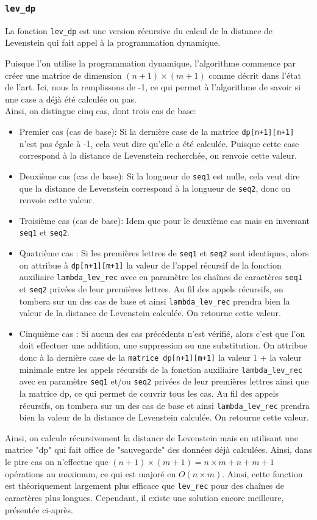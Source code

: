 \documentclass[12pt]{article}
\begin{document}
\subsubsection{\texttt{lev\_dp}}
La fonction \texttt{lev\_dp} est une version récursive du calcul de la distance de Levenstein qui fait appel à la programmation dynamique.

Puisque l'on utilise la programmation dynamique, l'algorithme commence par créer une matrice de dimension $(n+1)\times (m+1)$ comme décrit dans l'état de l'art. Ici, nous la remplissons de -1, ce qui permet à l'algorithme de savoir si une case a déjà  été calculée ou pas.\\
Ainsi, on distingue cinq cas, dont trois cas de base:
\begin{itemize}
    \item Premier cas (cas de base): Si la dernière case de la matrice \texttt{dp[n+1][m+1]} n'est pas égale à -1, cela veut dire qu'elle a été calculée. Puisque cette case correspond à la distance de Levenstein recherchée, on renvoie cette valeur.
    \item Deuxième cas (cas de base): Si la longueur de \texttt{seq1} est nulle, cela veut dire que la distance de Levenstein correspond à la longueur de \texttt{seq2}, donc on renvoie cette valeur.
    \item Troisième cas (cas de base): Idem que pour le deuxième cas mais en inversant \texttt{seq1} et \texttt{seq2}.
    \item Quatrième cas : Si les premières lettres de \texttt{seq1} et \texttt{seq2} sont identiques, alors on attribue à \texttt{dp[n+1][m+1]} la valeur de l'appel récursif de la fonction auxiliaire \texttt{lambda\_lev\_rec} avec en paramètre les chaînes de caractères \texttt{seq1} et \texttt{seq2} privées de leur premières lettres. Au fil des appels récursifs, on tombera sur un des cas de base et ainsi \texttt{lambda\_lev\_rec} prendra bien la valeur de la distance de Levenstein calculée. On retourne cette valeur.
    \item Cinquième cas : Si aucun des cas précédents n'est vérifié, alors c'est que l'on doit effectuer une addition, une suppression ou une substitution. On attribue donc à la dernière case de la \texttt{matrice dp[n+1][m+1]} la valeur 1 + la valeur minimale entre les appels récursifs de la fonction auxiliaire \texttt{lambda\_lev\_rec} avec en paramètre \texttt{seq1} et/ou \texttt{seq2} privées de leur premières lettres ainsi que la matrice dp, ce qui permet de couvrir tous les cas. Au fil des appels récursifs, on tombera sur un des cas de base et ainsi \texttt{lambda\_lev\_rec} prendra bien la valeur de la distance de Levenstein calculée. On retourne cette valeur.
\end{itemize}
Ainsi, on calcule récursivement la distance de Levenstein mais en utilisant une matrice "dp" qui fait office de "sauvegarde" des données déjà calculées. Ainsi, dans le pire cas on n'effectue que $(n+1)\times (m+1) = n\times m +n +m +1$ opérations au maximum, ce qui est majoré en $O(n\times m)$. Ainsi, cette fonction est théoriquement largement plus efficace que \texttt{lev\_rec} pour des chaînes de caractères plus longues. Cependant, il existe une solution encore meilleure, présentée ci-après. 
\end{document}
